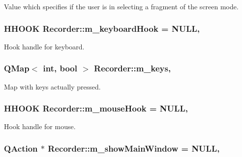 Value which specifies if the user is in selecting a fragment of the screen mode. 

\hypertarget{class_recorder_ac75a3adc936900eeba379048a2622215}{
\subsubsection[{m\-\_\-keyboard\-Hook}]{\setlength{\rightskip}{0pt plus 5cm}H\-H\-O\-O\-K Recorder\-::m\-\_\-keyboard\-Hook = N\-U\-L\-L\hspace{0.3cm}{\ttfamily [static]}, {\ttfamily [private]}}}\label{class_recorder_ac75a3adc936900eeba379048a2622215}


Hook handle for keyboard. 

\hypertarget{class_recorder_ae73e169cfea87f1de570875fd2ed79de}{
\subsubsection[{m\-\_\-keys}]{\setlength{\rightskip}{0pt plus 5cm}Q\-Map$<$ int, bool $>$ Recorder\-::m\-\_\-keys\hspace{0.3cm}{\ttfamily [static]}, {\ttfamily [private]}}}\label{class_recorder_ae73e169cfea87f1de570875fd2ed79de}


Map with keys actually pressed. 

\hypertarget{class_recorder_afc492637af50f03afea3ee346097bef5}{
\subsubsection[{m\-\_\-mouse\-Hook}]{\setlength{\rightskip}{0pt plus 5cm}H\-H\-O\-O\-K Recorder\-::m\-\_\-mouse\-Hook = N\-U\-L\-L\hspace{0.3cm}{\ttfamily [static]}, {\ttfamily [private]}}}\label{class_recorder_afc492637af50f03afea3ee346097bef5}


Hook handle for mouse. 

\hypertarget{class_recorder_a22859a75275df586d8d7a25b6208e86a}{
\subsubsection[{m\-\_\-show\-Main\-Window}]{\setlength{\rightskip}{0pt plus 5cm}Q\-Action $\ast$ Recorder\-::m\-\_\-show\-Main\-Window = N\-U\-L\-L\hspace{0.3cm}{\ttfamily [static]}, {\ttfamily [private]}}}\label{class_recorder_a22859a75275df586d8d7a25b6208e86a}


